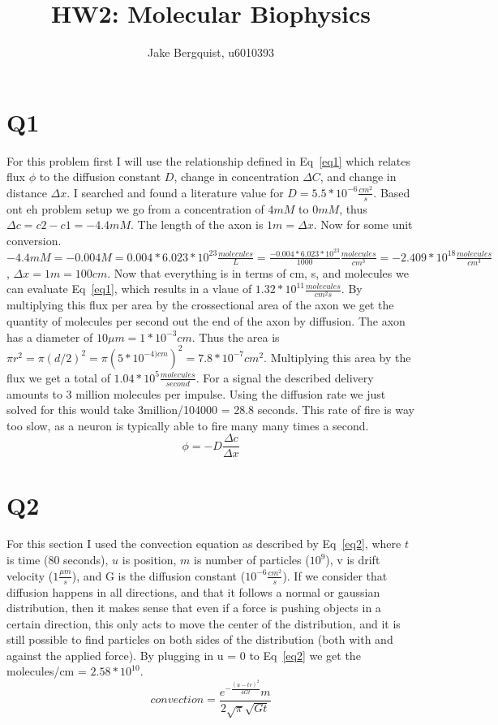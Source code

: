 \documentclass[12pt]{article}
\begin{document}
	
	


\title{HW2: Molecular Biophysics}
\author{Jake Bergquist, u6010393 }
\maketitle

\section{Q1}
For this problem first I will use the relationship defined in Eq~\ref{eq1} which relates flux $\phi$ to the diffusion constant $D$, change in concentration $\Delta C$, and change in distance $\Delta x$. I searched and found a literature value for $D = 5.5*10^{-6}\frac{cm^2}{s}$. Based ont eh problem setup we go from a concentration of $4 mM$ to $0 mM$, thus $\Delta c = c2-c1 = -4.4mM$. The length of the axon is $1m = \Delta x$. Now for some unit conversion. $-4.4 mM = -0.004 M = 0.004 * 6.023*10^{23}\frac{molecules}{L} = \frac{-0.004 * 6.023*10^{23}}{1000}\frac{molecules}{cm^3} = -2.409 * 10^{18} \frac{molecules}{cm^3}$, $\Delta x = 1m = 100 cm$. Now that everything is in terms of cm, s, and molecules we can evaluate Eq~\ref{eq1}, which results in a vlaue of $1.32*10^{11}\frac{molecules}{cm^2s}$. By multiplying this flux per area by the crossectional area of the axon we get the quantity of molecules per second out the end of the axon by diffusion. The axon has a diameter of $10\mu m = 1*10^{-3} cm$. Thus the area is $\pi r^2 = \pi (d/2)^2 =\pi (5*10^{-4)cm})^2 = 7.8*10^{-7} cm^2$. Multiplying this area by the flux we get a total of $1.04*10^5 \frac{molecules}{second}$.  For a signal the described delivery amounts to 3 million molecules per impulse. Using the diffusion rate we just solved for this would take 3million/104000 = 28.8 seconds. This rate of fire is way too slow, as a neuron is typically able to fire many many times a second.
\begin{equation}
\phi = -D \frac{\Delta c}{\Delta x}
\label{eq1}
\end{equation}
\section{Q2}
For this section I used the convection equation as described by Eq~\ref{eq2}, where $t$ is time (80 seconds), $u$ is position, $m$ is number of particles ($10^9$), v is drift velocity ($1\frac{\mu m}{s}$), and G is the diffusion constant ($10^{-6}\frac{cm^2}{s}$). If we consider that diffusion happens in all directions, and that it follows a normal or gaussian distribution, then it makes sense that even if a force is pushing objects in a certain direction, this only acts to move the center of the distribution, and it is still possible to find particles on both sides of the distribution (both with and against the applied force). By plugging in u = 0 to Eq~\ref{eq2} we get the molecules/cm = $2.58*10^{10}$.
\begin{equation}
convection = \frac{e^{-\frac{(u - tv)^2}{4Gt}}m}{2\sqrt{\pi}\sqrt{Gt}}
\label{eq2}
\end{equation}
\end{document}
